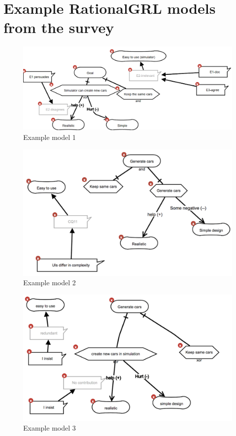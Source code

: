 \section{Example RationalGRL models from the survey}
\label{sect:survey-screenshots}

\begin{figure}[ht]
\centering
\includegraphics[scale=0.3]{img/survey/survey1}
\caption{Example model 1}
\label{fig:survey1}
\end{figure}

\begin{figure}[ht]
\centering
\includegraphics[scale=0.4]{img/survey/survey2}
\caption{Example model 2}
\label{fig:survey2}
\end{figure}

\begin{figure}[ht]
\centering
\includegraphics[scale=0.3]{img/survey/survey3}
\caption{Example model 3}
\label{fig:survey3}
\end{figure}
